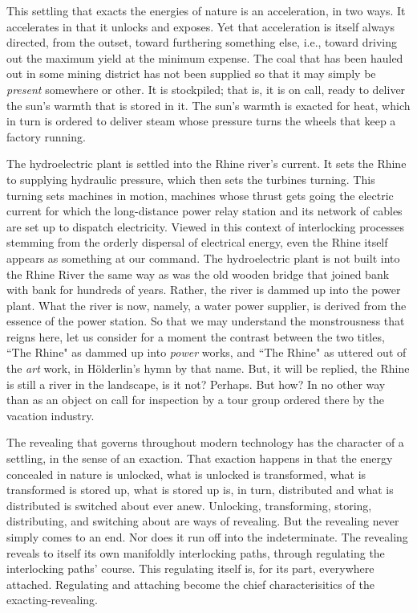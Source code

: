This settling that exacts the energies of nature is an acceleration, in two ways. It accelerates in that it unlocks and exposes. Yet that acceleration is itself always directed, from the outset, toward furthering something else, i.e., toward driving out the maximum yield at the minimum expense. The coal that has been hauled out in some mining district has not been supplied so that it may simply be \textit{present} somewhere or other. It is stockpiled; that is, it is on call, ready to deliver the sun's warmth that is stored in it. The sun's warmth is exacted for heat, which in turn is ordered to deliver steam whose pressure turns the wheels that keep a factory running.

The hydroelectric plant is settled into the Rhine river's current. It sets the Rhine to supplying hydraulic pressure, which then sets the turbines turning. This turning sets machines in motion, machines whose thrust gets going the electric current for which the long-distance power relay station and its network of cables are set up to dispatch electricity. Viewed in this context of interlocking processes stemming from the orderly dispersal of electrical energy, even the Rhine itself appears as something at our command. The hydroelectric plant is not built into the Rhine River the same way as was the old wooden bridge that joined bank with bank for hundreds of years. Rather, the river is dammed up into the power plant. What the river is now, namely, a water power supplier, is derived from the essence of the power station. So that we may understand the monstrousness that reigns here, let us consider for a moment the contrast between the two titles, ``The Rhine" as dammed up into \textit{power} works, and ``The Rhine" as uttered out of the \textit{art} work, in H\"{o}lderlin's hymn by that name. But, it will be replied, the Rhine is still a river in the landscape, is it not? Perhaps. But how? In no other way than as an object on call for inspection by a tour group ordered there by the vacation industry.

The revealing that governs throughout modern technology has the character of a settling, in the sense of an exaction. That exaction happens in that the energy concealed in nature is unlocked, what is unlocked is transformed, what is transformed is stored up, what is stored up is, in turn, distributed and what is distributed is switched about ever anew. Unlocking, transforming, storing, distributing, and switching about are ways of revealing. But the revealing never simply comes to an end. Nor does it run off into the indeterminate. The revealing reveals to itself its own manifoldly interlocking paths, through regulating the interlocking paths' course. This regulating itself is, for its part, everywhere attached. Regulating and attaching become the chief characterisitics of the exacting-revealing.

